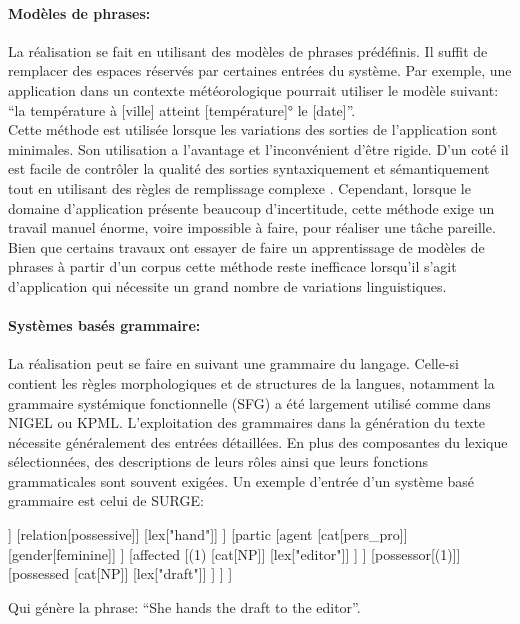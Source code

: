	\paragraph{Modèles de phrases:} La réalisation se fait en utilisant des modèles de phrases prédéfinis. Il suffit de remplacer des espaces réservés par certaines entrées du système. Par exemple, une application dans un contexte météorologique pourrait utiliser le modèle suivant: “la température à [ville] atteint [température]° le [date]”.\\
Cette méthode est utilisée lorsque les variations des sorties de l’application sont minimales. Son utilisation a l’avantage et l’inconvénient d’être rigide. D’un coté il est facile de contrôler la qualité des sorties syntaxiquement et sémantiquement tout en utilisant des règles de remplissage complexe \cite{Theune2001}. Cependant, lorsque le domaine d’application présente beaucoup d’incertitude, cette méthode exige un travail manuel énorme, voire impossible à faire, pour réaliser une tâche pareille. Bien que certains travaux ont essayer de faire un apprentissage de modèles de phrases à partir d’un corpus\cite{Angeli2012} cette méthode reste inefficace lorsqu’il s’agit d’application qui nécessite un grand nombre de variations linguistiques.
	\paragraph{Systèmes basés grammaire:} La réalisation peut se faire en suivant une grammaire du langage. Celle-si contient les règles morphologiques et de structures de la langues, notamment la grammaire systémique fonctionnelle (SFG)\cite{Halliday2004} a été largement utilisé comme dans NIGEL\cite{Mann1983} ou KPML\cite{Bateman1997}. L’exploitation des grammaires dans la génération du texte nécessite généralement des entrées détaillées. En plus des composantes du lexique sélectionnées, des descriptions de leurs rôles ainsi que leurs fonctions grammaticales sont souvent exigées. Un exemple d’entrée d’un système basé grammaire est celui de SURGE\cite{Elhadad1996}:
	\begin{center}
		\begin{forest} [
			[cat:clause]
			[process
			[type[composite]]
			[relation[possessive]]
			[lex[\color{red}"hand"]]
			]
			[partic
			[agent
			[cat[pers\_pro]]
			[gender[feminine]]
			]
			[affected
			[(1)
			[cat[NP]]
			[lex[\color{red}"editor"]]
			]
			]
			[possessor[(1)]]
			[possessed
			[cat[NP]]
			[lex[\color{red}"draft"]]
			]
			]
			]
		\end{forest}
	\end{center}
	Qui génère la phrase: “She hands the draft to the editor”.\newline

